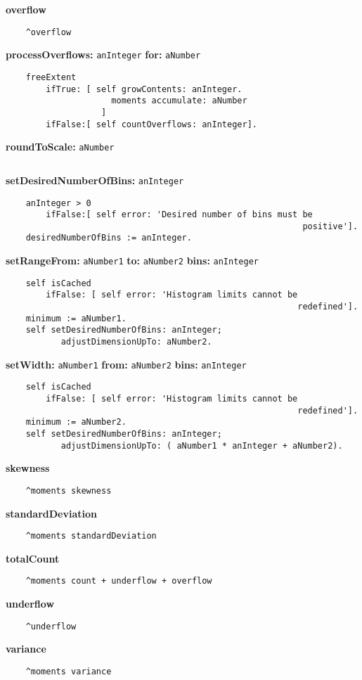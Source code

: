 {\bf overflow}
\begin{verbatim}
    ^overflow

\end{verbatim}
{\bf processOverflows:} {\tt anInteger} {\bf for:} {\tt aNumber}
\begin{verbatim}
    freeExtent
        ifTrue: [ self growContents: anInteger.
                     moments accumulate: aNumber
                   ]
        ifFalse:[ self countOverflows: anInteger].

\end{verbatim}
{\bf roundToScale:} {\tt aNumber}
\begin{verbatim}

\end{verbatim}
{\bf setDesiredNumberOfBins:} {\tt anInteger}
\begin{verbatim}
    anInteger > 0
        ifFalse:[ self error: 'Desired number of bins must be 
                                                           positive'].
    desiredNumberOfBins := anInteger.

\end{verbatim}
{\bf setRangeFrom:} {\tt aNumber1} {\bf to:} {\tt aNumber2} {\bf bins:} {\tt anInteger}
\begin{verbatim}
    self isCached
        ifFalse: [ self error: 'Histogram limits cannot be 
                                                          redefined'].
    minimum := aNumber1.
    self setDesiredNumberOfBins: anInteger;
           adjustDimensionUpTo: aNumber2.

\end{verbatim}
{\bf setWidth:} {\tt aNumber1} {\bf from:} {\tt aNumber2} {\bf bins:} {\tt anInteger}
\begin{verbatim}
    self isCached
        ifFalse: [ self error: 'Histogram limits cannot be 
                                                          redefined'].
    minimum := aNumber2.
    self setDesiredNumberOfBins: anInteger;
           adjustDimensionUpTo: ( aNumber1 * anInteger + aNumber2).

\end{verbatim}
{\bf skewness}
\begin{verbatim}
    ^moments skewness

\end{verbatim}
{\bf standardDeviation}
\begin{verbatim}
    ^moments standardDeviation

\end{verbatim}
{\bf totalCount}
\begin{verbatim}
    ^moments count + underflow + overflow

\end{verbatim}
{\bf underflow}
\begin{verbatim}
    ^underflow

\end{verbatim}
{\bf variance}
\begin{verbatim}
    ^moments variance

\end{verbatim}

